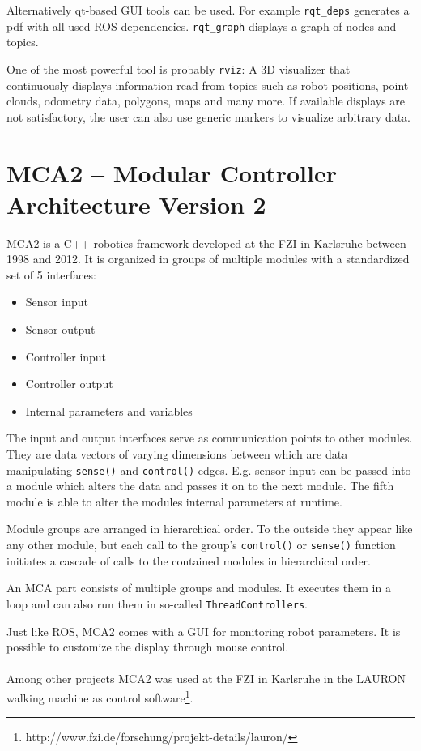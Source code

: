 Alternatively qt-based GUI tools can be used. For example \texttt{rqt\_deps} generates a pdf with all used ROS dependencies. \texttt{rqt\_graph} displays a graph of nodes and topics.

One of the most powerful tool is probably \texttt{rviz}: A 3D visualizer that continuously displays information read from topics such as robot positions, point clouds, odometry data, polygons, maps and many more. If available displays are not satisfactory, the user can also use generic markers to visualize arbitrary data.

\section{MCA2 -- Modular Controller Architecture Version 2}
MCA2 is a C++ robotics framework developed at the FZI in Karlsruhe between 1998 and 2012. It is organized in groups of multiple modules with a standardized set of 5 interfaces: 
\begin{itemize}
\item Sensor input
\item Sensor output
\item Controller input
\item Controller output
\item Internal parameters and variables
\end{itemize}

The input and output interfaces serve as communication points to other modules. They are data vectors of varying dimensions between which are data manipulating \texttt{sense()} and \texttt{control()} edges. E.g. sensor input can be passed into a module which alters the data and passes it on to the next module. The fifth module is able to alter the modules internal parameters at runtime.

Module groups are arranged in hierarchical order. To the outside they appear like any other module, but each call to the group's \texttt{control()} or \texttt{sense()} function initiates a cascade of calls to the contained modules in hierarchical order.

An MCA part consists of multiple groups and modules. It executes them in a loop and can also run them in so-called \texttt{ThreadControllers}.

Just like ROS, MCA2 comes with a GUI for monitoring robot parameters. It is possible to customize the display through mouse control.
\\\\
Among other projects MCA2 was used at the FZI in Karlsruhe in the LAURON walking machine as control software\footnote{http://www.fzi.de/forschung/projekt-details/lauron/}.

